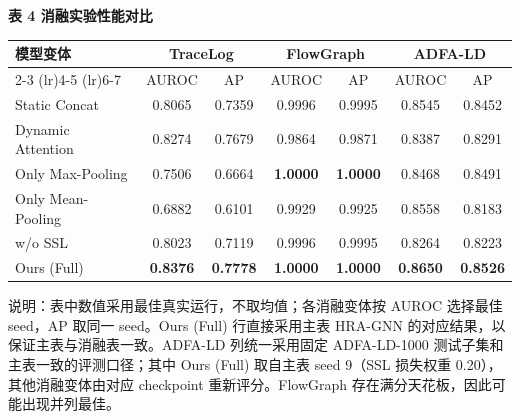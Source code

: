\begin{table}[t]
\centering
\textbf{表 4 消融实验性能对比}\par\vspace{3pt}
\scriptsize
\renewcommand{\arraystretch}{0.94}
\setlength{\tabcolsep}{4pt}
\begin{tabular}{lcccccc}
\toprule
\multirow{2}{*}{模型变体} & \multicolumn{2}{c}{TraceLog} & \multicolumn{2}{c}{FlowGraph} & \multicolumn{2}{c}{ADFA-LD} \\
\cmidrule(lr){2-3} \cmidrule(lr){4-5} \cmidrule(lr){6-7}
 & AUROC & AP & AUROC & AP & AUROC & AP \\
\midrule
Static Concat & 0.8065 & 0.7359 & 0.9996 & 0.9995 & 0.8545 & 0.8452 \\
Dynamic Attention & 0.8274 & 0.7679 & 0.9864 & 0.9871 & 0.8387 & 0.8291 \\
Only Max-Pooling & 0.7506 & 0.6664 & \textbf{1.0000} & \textbf{1.0000} & 0.8468 & 0.8491 \\
Only Mean-Pooling & 0.6882 & 0.6101 & 0.9929 & 0.9925 & 0.8558 & 0.8183 \\
w/o SSL & 0.8023 & 0.7119 & 0.9996 & 0.9995 & 0.8264 & 0.8223 \\
\midrule
Ours (Full) & \textbf{0.8376} & \textbf{0.7778} & \textbf{1.0000} & \textbf{1.0000} & \textbf{0.8650} & \textbf{0.8526} \\
\bottomrule
\end{tabular}%
\par\vspace{2pt}
\begin{minipage}{\textwidth}
\scriptsize
说明：表中数值采用最佳真实运行，不取均值；各消融变体按 AUROC 选择最佳 seed，AP 取同一 seed。Ours (Full) 行直接采用主表 HRA-GNN 的对应结果，以保证主表与消融表一致。ADFA-LD 列统一采用固定 ADFA-LD-1000 测试子集和主表一致的评测口径；其中 Ours (Full) 取自主表 seed 9（SSL 损失权重 0.20），其他消融变体由对应 checkpoint 重新评分。FlowGraph 存在满分天花板，因此可能出现并列最佳。
\end{minipage}
\end{table}
